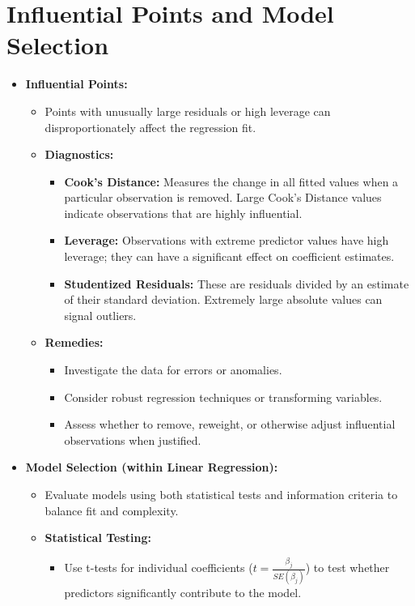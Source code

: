\documentclass[10pt]{article}
\begin{document}
\section{Influential Points and Model Selection}
\begin{itemize}
    \item \textbf{Influential Points:}
    \begin{itemize}
        \item Points with unusually large residuals or high leverage can disproportionately affect the regression fit.
        \item \textbf{Diagnostics:}
        \begin{itemize}
            \item \textbf{Cook's Distance:} Measures the change in all fitted values when a particular observation is removed. Large Cook's Distance values indicate observations that are highly influential.
            \item \textbf{Leverage:} Observations with extreme predictor values have high leverage; they can have a significant effect on coefficient estimates.
            \item \textbf{Studentized Residuals:} These are residuals divided by an estimate of their standard deviation. Extremely large absolute values can signal outliers.
        \end{itemize}
        \item \textbf{Remedies:}
        \begin{itemize}
            \item Investigate the data for errors or anomalies.
            \item Consider robust regression techniques or transforming variables.
            \item Assess whether to remove, reweight, or otherwise adjust influential observations when justified.
        \end{itemize}
    \end{itemize}
    \item \textbf{Model Selection (within Linear Regression):}
    \begin{itemize}
        \item Evaluate models using both statistical tests and information criteria to balance fit and complexity.
        \item \textbf{Statistical Testing:}
        \begin{itemize}
            \item Use t-tests for individual coefficients (\(t = \frac{\beta_j}{SE(\beta_j)}\)) to test whether predictors significantly contribute to the model.

\end{itemize}
\end{itemize}
\end{itemize}
\end{document}
